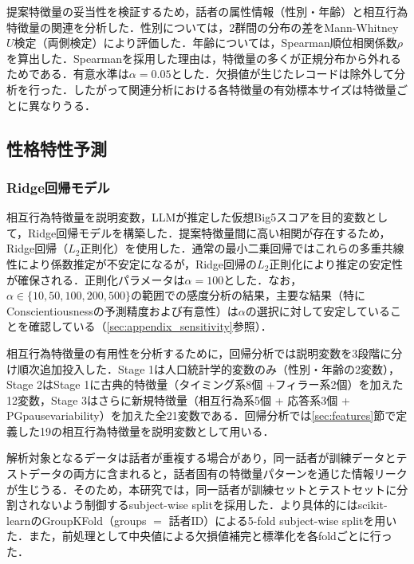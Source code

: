 \documentclass[dvipdfmx,11pt,a4paper]{bxjsarticle}
\renewcommand{\_}{\paperorigunderscore\allowbreak}%
\begin{document}
提案特徴量の妥当性を検証するため，話者の属性情報（性別・年齢）と相互行為特徴量の関連を分析した．性別については，2群間の分布の差をMann-Whitney $U$検定（両側検定）により評価した．年齢については，Spearman順位相関係数$\rho$を算出した．Spearmanを採用した理由は，特徴量の多くが正規分布から外れるためである．有意水準は$\alpha = 0.05$とした．欠損値が生じたレコードは除外して分析を行った．したがって関連分析における各特徴量の有効標本サイズは特徴量ごとに異なりうる．


\subsection{性格特性予測}
\label{sec:pred_personality}

\subsubsection{Ridge回帰モデル}

相互行為特徴量を説明変数，LLMが推定した仮想Big5スコアを目的変数として，Ridge回帰モデルを構築した．提案特徴量間に高い相関が存在するため，Ridge回帰（$L_2$正則化）を使用した．通常の最小二乗回帰ではこれらの多重共線性により係数推定が不安定になるが，Ridge回帰の$L_2$正則化により推定の安定性が確保される．正則化パラメータは$\alpha = 100$とした．なお，$\alpha \in \{10, 50, 100, 200, 500\}$の範囲での感度分析の結果，主要な結果（特にConscientiousnessの予測精度および有意性）は$\alpha$の選択に対して安定していることを確認している（\ref{sec:appendix_sensitivity}参照）．

相互行為特徴量の有用性を分析するために，回帰分析では説明変数を3段階に分け順次追加投入した．Stage 1は人口統計学的変数のみ（性別・年齢の2変数），Stage 2はStage 1に古典的特徴量（タイミング系8個 +フィラー系2個）を加えた12変数，Stage 3はさらに新規特徴量（相互行為系5個 + 応答系3個 + PG\_pause\_variability）を加えた全21変数である．回帰分析では\ref{sec:features}節で定義した19の相互行為特徴量を説明変数として用いる．

解析対象となるデータは話者が重複する場合があり，同一話者が訓練データとテストデータの両方に含まれると，話者固有の特徴量パターンを通じた情報リークが生じうる．そのため，本研究では，同一話者が訓練セットとテストセットに分割されないよう制御するsubject-wise splitを採用した．より具体的にはscikit-learnのGroupKFold（groups $=$ 話者ID）による5-fold subject-wise splitを用いた．また，前処理として中央値による欠損値補完と標準化を各foldごとに行った．

\end{document}
